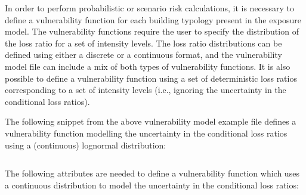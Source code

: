 In order to perform probabilistic or scenario risk calculations, it is
necessary to define a \gls{vulnerability function} for each building typology
present in the exposure model. The \glspl{vulnerability function} require the
user to specify the distribution of the loss ratio for a set of intensity
levels. The loss ratio distributions can be defined using either a discrete or
a continuous format, and the \gls{vulnerability model} file can include a mix
of both types of \glspl{vulnerability function}. It is also possible to define
a vulnerability function using a set of deterministic loss ratios
corresponding to a set of intensity levels (i.e., ignoring the uncertainty in
the conditional loss ratios).

The following snippet from the above \gls{vulnerability model} example file defines
a \gls{vulnerability function} modelling the uncertainty in the conditional loss
ratios using a (continuous) lognormal distribution:

\inputminted[firstline=10,firstnumber=10,lastline=14,fontsize=\footnotesize,frame=single,linenos,bgcolor=lightgray]{xml}{oqum/risk/Verbatim/input_vulnerability.xml}

The following attributes are needed to define a \gls{vulnerability function} which
uses a continuous distribution to model the uncertainty in the conditional
loss ratios:

